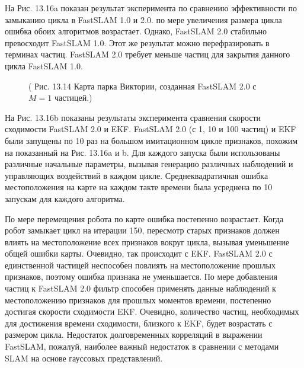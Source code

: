 \documentclass[10pt,a4paper]{article}
\begin{document}
На Рис. 13.16a показан результат эксперимента по сравнению эффективности по замыканию цикла в FastSLAM 1.0 и 2.0. по мере увеличения размера цикла ошибка обоих алгоритмов возрастает. Однако, FastSLAM 2.0 стабильно превосходит FastSLAM 1.0. Этот же результат можно перефразировать в терминах частиц. FastSLAM 2.0 требует меньше частиц для закрытия данного цикла FastSLAM 1.0.

\begin{figure}[H]
	\caption{ ( Рис. 13.14    Карта парка Виктории, созданная FastSLAM 2.0 с $M=1$ частицей.) }
	\label{fig:1314orig}
\end{figure}

На Рис. 13.16b показаны результаты эксперимента сравнения скорости сходимости FastSLAM 2.0 и EKF. FastSLAM 2.0 (с 1, 10 и 100 частиц) и EKF были запущены по 10 раз на большом имитационном цикле признаков, похожим на показанный на Рис. 13.16a и b. Для каждого запуска были использованы различные начальные параметры, вызывая генерацию различных наблюдений и управляющих воздействий в каждом цикле. Среднеквадратичная ошибка местоположения на карте на каждом такте времени была усреднена по 10 запускам для каждого алгоритма.

По мере перемещения робота по карте ошибка постепенно возрастает. Когда робот замыкает цикл на итерации 150, пересмотр старых признаков должен влиять на местоположение всех признаков вокруг цикла, вызывая уменьшение общей ошибки карты. Очевидно, так происходит с EKF. FastSLAM 2.0 с единственной частицей неспособен повлиять на местоположение прошлых признаков, поэтому ошибка признака не уменьшается. По мере добавления частиц к FastSLAM 2.0 фильтр способен применять данные наблюдений к местоположению признаков для прошлых моментов времени, постепенно достигая скорости сходимости EKF. Очевидно, количество частиц, необходимых для достижения времени сходимости, близкого к EKF, будет возрастать с размером цикла. Недостаток долговременных корреляций в выражении FastSLAM, пожалуй, наиболее важный недостаток в сравнении с методами SLAM на основе гауссовых представлений.
\end{document}
